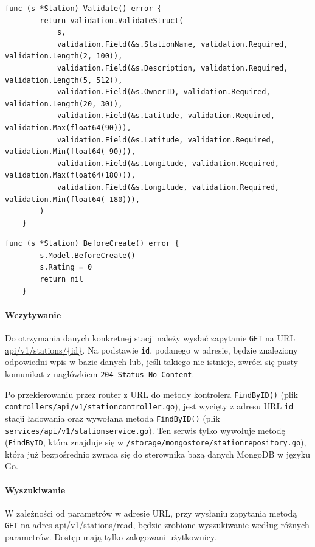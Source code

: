 \begin{lstlisting}[label=list:validation_station,caption=Walidacja danych stacji ładowania.,basicstyle=\tiny\ttfamily]
    func (s *Station) Validate() error {
        return validation.ValidateStruct(
            s,
            validation.Field(&s.StationName, validation.Required, validation.Length(2, 100)),
            validation.Field(&s.Description, validation.Required, validation.Length(5, 512)),
            validation.Field(&s.OwnerID, validation.Required, validation.Length(20, 30)),
            validation.Field(&s.Latitude, validation.Required, validation.Max(float64(90))),
            validation.Field(&s.Latitude, validation.Required, validation.Min(float64(-90))),
            validation.Field(&s.Longitude, validation.Required, validation.Max(float64(180))),
            validation.Field(&s.Longitude, validation.Required, validation.Min(float64(-180))),
        )
    }
\end{lstlisting}

\begin{lstlisting}[label=list:before_create_station,caption=Uzupełnienie danych systemowych dotyczących.,basicstyle=\tiny\ttfamily]
    func (s *Station) BeforeCreate() error {
        s.Model.BeforeCreate()
        s.Rating = 0
        return nil
    }
\end{lstlisting}

\paragraph{Wczytywanie\newline}
Do otrzymania danych konkretnej stacji należy wysłać zapytanie \texttt{GET} na URL \url{api/v1/stations/{id}}.
Na podstawie \texttt{id}, podanego w adresie, będzie znaleziony odpowiedni wpis w bazie danych lub, jeśli takiego nie istnieje, zwróci się pusty komunikat z nagłówkiem \texttt{204 Status No Content}.

Po przekierowaniu przez router z URL do metody kontrolera \texttt{FindByID()} (plik \texttt{controllers/api/v1/stationcontroller.go}), jest wycięty z adresu URL \texttt{id} stacji ładowania oraz wywołana metoda \texttt{FindByID()} (plik \texttt{services/api/v1/stationservice.go}).
Ten serwis tylko wywołuje metodę (\texttt{FindByID}, która znajduje się w \texttt{/storage/mongostore/stationrepository.go}), która już bezpośrednio zwraca się do sterownika bazą danych MongoDB w języku Go.
%
\paragraph{Wyszukiwanie\newline}
W zależności od parametrów w adresie URL, przy wysłaniu zapytania metodą \texttt{GET} na adres \url{api/v1/stations/read}, będzie zrobione wyszukiwanie według różnych parametrów.
Dostęp mają tylko zalogowani użytkownicy.

